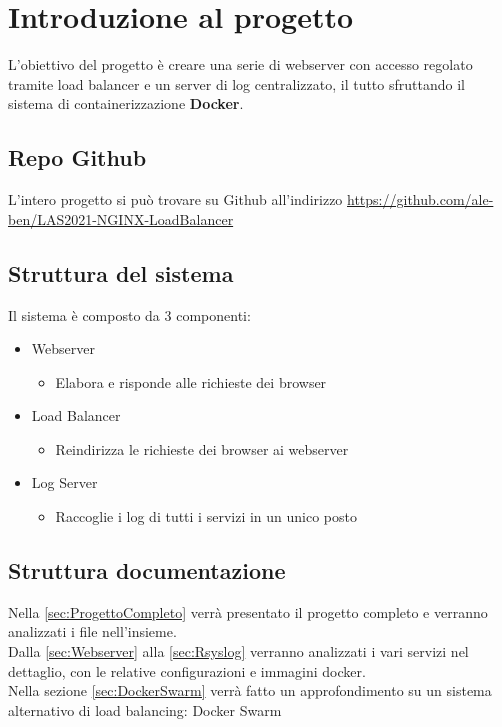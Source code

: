 \documentclass[../DocumentazioneProgetto.tex]{subfiles}
\begin{document}
	\section{Introduzione al progetto}
	L'obiettivo del progetto è creare una serie di webserver con accesso regolato tramite load balancer e un server di log centralizzato, il tutto sfruttando il sistema di containerizzazione \textbf{Docker}.
	\subsection{Repo Github} 
	L'intero progetto si può trovare su Github all'indirizzo \href{https://github.com/ale-ben/LAS2021-NGINX-LoadBalancer}{https://github.com/ale-ben/LAS2021-NGINX-LoadBalancer}
	\subsection{Struttura del sistema} 
	Il sistema è composto da 3 componenti:
	\begin{itemize}
		\item Webserver
		\begin{itemize}
			\item Elabora e risponde alle richieste dei browser
		\end{itemize}
		\item Load Balancer
		\begin{itemize}
			\item Reindirizza le richieste dei browser ai webserver
		\end{itemize}
		\item Log Server
		\begin{itemize}
			\item Raccoglie i log di tutti i servizi in un unico posto
		\end{itemize}
	\end{itemize}
	\subsection{Struttura documentazione}
	Nella \autoref{sec:ProgettoCompleto} verrà presentato il progetto completo e verranno analizzati i file nell'insieme.\\
	Dalla  \autoref{sec:Webserver} alla \autoref{sec:Rsyslog} verranno analizzati i vari servizi nel dettaglio, con le relative configurazioni e immagini docker.\\
	Nella sezione \autoref{sec:DockerSwarm} verrà fatto un approfondimento su un sistema alternativo di load balancing: Docker Swarm
\end{document}
